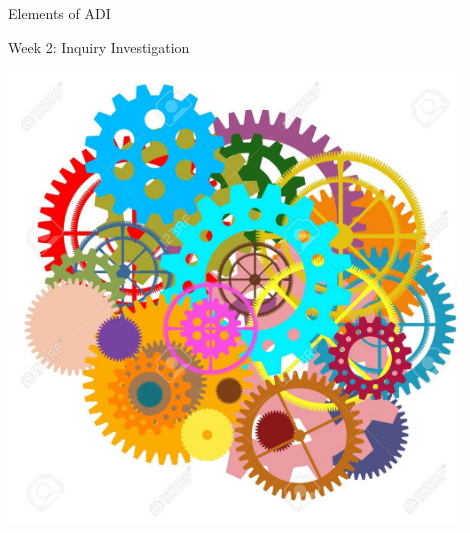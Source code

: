 \documentclass[xcolor=dvipsnames,table]{beamer}
\begin{document}
{\begin{frame}{Elements of ADI}
\begin{block}{Week 2: Inquiry Investigation}
\begin{minipage}{0.75\textwidth}
\begin{itemize}
        \end{itemize}
      \end{minipage}\hfill
      \begin{minipage}{0.2\textwidth}
        \centering \includegraphics[width=0.9\textwidth]{./clipart/gears.jpg}
      \end{minipage}
    \end{block}
  \end{frame}
}
\end{document}
